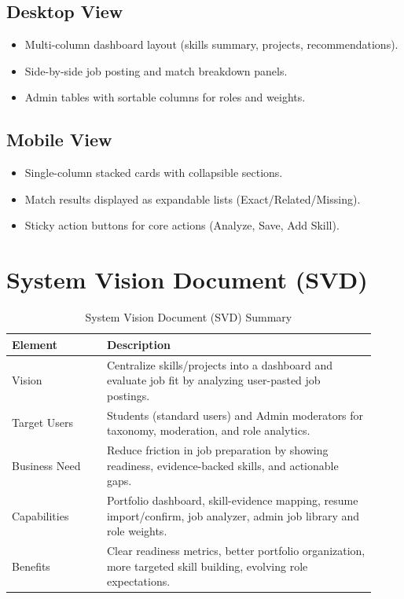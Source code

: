 \documentclass[11pt]{article}
\begin{document}
\subsection{Desktop View}
\begin{itemize}[leftmargin=*]
  \item Multi-column dashboard layout (skills summary, projects, recommendations).
  \item Side-by-side job posting and match breakdown panels.
  \item Admin tables with sortable columns for roles and weights.
\end{itemize}

\subsection{Mobile View}
\begin{itemize}[leftmargin=*]
  \item Single-column stacked cards with collapsible sections.
  \item Match results displayed as expandable lists (Exact/Related/Missing).
  \item Sticky action buttons for core actions (Analyze, Save, Add Skill).
\end{itemize}

\section{System Vision Document (SVD)} %
\begin{table}[H]
\centering
\renewcommand{\arraystretch}{1.2}
\begin{tabular}{p{0.24\linewidth} p{0.68\linewidth}}
\toprule
\textbf{Element} & \textbf{Description} \\
\midrule
Vision & Centralize skills/projects into a dashboard and evaluate job fit by analyzing user-pasted job postings. \\
Target Users & Students (standard users) and Admin moderators for taxonomy, moderation, and role analytics. \\
Business Need & Reduce friction in job preparation by showing readiness, evidence-backed skills, and actionable gaps. \\
Capabilities & Portfolio dashboard, skill-evidence mapping, resume import/confirm, job analyzer, admin job library and role weights. \\
Benefits & Clear readiness metrics, better portfolio organization, more targeted skill building, evolving role expectations. \\
\bottomrule
\end{tabular}
\caption{System Vision Document (SVD) Summary}
\end{table}
\end{document}

